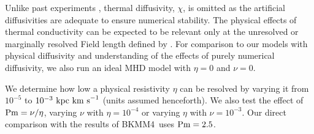 \documentclass[preprint2]{aastex63}
\newcommand\Pm{{\rm Pm} }
\newcommand\kpc{~ {\rm kpc}}
\newcommand\dx{ {\delta x}}
\newcommand\kms{~ {\rm km~ s}^{-1}}
\newcommand\BKM{{\sf BKMM4}}
\newcommand{\fg}[1]{\textcolor{midgreen}{#1}}
\newcommand{\mm}[1]{\textcolor{mypurple}{#1}}
\newcommand{\fag}[1]{\textcolor{midblue}{FAG: #1}}
\begin{document}

 \fg{Unlike past} experiments \citep{Gent:2013a,Gent:2013b,GMKSH20},
 thermal diffusivity, $\chi$, \fg{is omitted as} the artificial diffusivities
 are adequate to ensure numerical stability.
 \fg{The} physical effects of thermal
 conductivity can be expected to be relevant only at the unresolved or
 marginally resolved Field length defined by \citet[][named after George
 Field, not the magnetic field]{BM90}.
%
 \mm{For comparison to our models with physical diffusivity and
   understanding of the effects of purely numerical diffusivity, we
   also run an ideal MHD model with}
 $\eta=0$ \fg{and $\nu=0$.}

 We determine how low a physical resistivity $\eta$ can be resolved by varying
 it from $10^{-5}$ to $10^{-3}\kpc\kms$ (units assumed henceforth).
 \fg{We also test the effect of $\Pm=\nu/\eta$, varying $\nu$ with 
 $\eta=10^{-4}$ or varying $\eta$ with $\nu=10^{-3}$.}
 Our direct comparison with the results of \fg{\BKM\ }uses $\Pm=2.5$.
 

\end{document}
